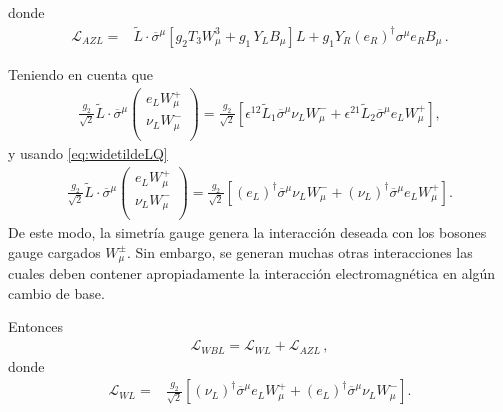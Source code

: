 donde
\begin{align}
\label{eq:lazl}
  \mathcal{L}_{A Z L}=& \widetilde{L}\cdot\overline{\sigma}^\mu\left[g_2 T_3W_\mu^3+{g_1}\,Y_LB_\mu\right]L+ {g_1} Y_R\left(e_R \right)^{\dagger}\sigma^\mu  {e_R} B_\mu\,.
\end{align}

Teniendo en cuenta que 
\begin{align}
  \frac{g_2}{\sqrt{2}}\widetilde{L}\cdot\overline{\sigma}^\mu
  \begin{pmatrix}
e_LW_\mu^+\\
\nu_L W_\mu^-\\    
  \end{pmatrix}=\frac{g_2}{\sqrt{2}} \left[ \epsilon^{12} \widetilde{L}_1 \overline{\sigma}^{\mu} \nu_L W_{\mu}^-
+\epsilon^{21}  \widetilde{L}_2 \overline{\sigma}^{\mu} e_L W_{\mu}^+ \right],
\end{align}
y usando \eqref{eq:widetildeLQ}
\begin{align}
  \frac{g_2}{\sqrt{2}}\widetilde{L}\cdot\overline{\sigma}^\mu
  \begin{pmatrix}
e_LW_\mu^+\\
\nu_L W_\mu^-\\    
  \end{pmatrix}=\frac{g_2}{\sqrt{2}} \left[\left( e_L \right)^{\dagger} \overline{\sigma}^{\mu} \nu_L W_{\mu}^-
+ \left( \nu_L \right)^{\dagger} \overline{\sigma}^{\mu} e_L W_{\mu}^+ \right].
\end{align}
De este modo, la simetría gauge genera la interacción deseada con los bosones gauge cargados $W_{\mu}^{\pm}$. Sin embargo, se generan muchas otras interacciones las cuales deben contener apropiadamente la interacción electromagnética en algún cambio de base.

Entonces
\begin{align}
  \mathcal{L}_{WBL}= \mathcal{L}_{W L}+  \mathcal{L}_{A Z L}\,,
\end{align}
donde
\begin{align}
\label{eq:lwl}
  \mathcal{L}_{W L}=&\frac{g_2}{\sqrt{2}}\left[\left( \nu_L \right)^{\dagger}\overline{\sigma}^\mu e_LW_\mu^++
\left( e_L \right)^{\dagger}\overline{\sigma}^\mu\nu_L W_\mu^-\right].
\end{align}

